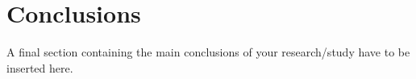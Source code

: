 \section{Conclusions}
A final section containing the main conclusions of your research/study have to be inserted here.
